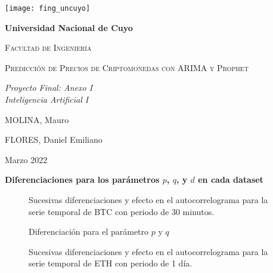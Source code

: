 \documentclass[a4paper,10pt]{article}
\begin{document}
\begin{titlepage}
\centering
{\texttt{[image: fing\_uncuyo]}\par}
\vspace{1cm}
{\bfseries\LARGE Universidad Nacional de Cuyo \par}
\vspace{1cm}
{\scshape\Large Facultad de Ingeniería \par}
\vspace{3cm}
{\scshape\Huge Predicción de Precios de Criptomonedas con ARIMA y Prophet \par}
\vspace{3cm}
{\itshape\Large Proyecto Final: Anexo I\\Inteligencia Artificial I \par}
\vfill
{\Large MOLINA, Mauro \par}
{\Large FLORES, Daniel Emiliano \par}
\vfill
{\Large Marzo 2022 \par}
\end{titlepage}

\newpage
\textbf{\large Diferenciaciones para los parámetros $p$, $q$, y $d$ en cada dataset}

\begin{figure}[h!]
 \centering
  \caption{Sucesivas diferenciaciones y efecto en el autocorrelograma para la serie temporal de BTC con periodo de 30 minutos.}
  \label{f:btc_30m_diff-fac}
\end{figure}


\begin{figure}[h!]
 \centering
  \caption{Diferenciación para el parámetro $p$ y $q$}
  \label{f:fac_btc_30m}
\end{figure}

\begin{figure}[h!]
 \centering
  \caption{Sucesivas diferenciaciones y efecto en el autocorrelograma para la serie temporal de ETH con periodo de 1 día.}
  \label{f:eth_1d_diff-fac}
\end{figure}
\end{document}
